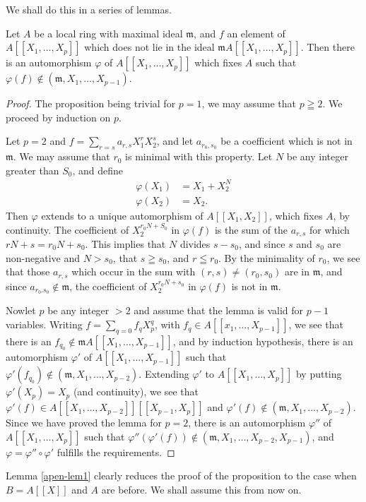 We shall do this in a series of lemmas.

\begin{lem}\label{apen-lem1}
Let $A$ be a local ring with maximal ideal $\mathfrak{m}$, and $f$ an element of $A \left[ [X_1, \ldots, X_p] \right]$ which does not lie in the ideal $\mathfrak{m} A \left[[X_1, \ldots, X_p] \right]$. Then there is an automorphism $\varphi$ of $A\left[[X_1, \ldots, X_p] \right]$ which fixes $A$ such that $\varphi (f)\not\in (\mathfrak{m}, X_1, \ldots, X_{p-1})$.
\end{lem}

\begin{proof}
The proposition being trivial for $p=1$, we may assume that $p \geqq 2$. We proceed by induction on $p$.

Let $p=2$ and $f = \sum\limits_{r = s} a_{r,s} X^r_1 X^s_2$, and let $a_{r_0, s_0}$ be a coefficient which is not in $\mathfrak{m}$. We may assume that $r_0$ is minimal with this property. Let $N$ be any integer greater than $S_0$, and define
\begin{align*}
\varphi (X_1) & = X_1 + X^N_2 \\
\varphi (X_2) & = X_2.
\end{align*}
Then $\varphi$ extends to a unique automorphism of $A \left[[X_1, X_2] \right]$, which fixes $A$, by continuity. The coefficient of $X^{r_0 N+ S_0}_2 $ in $\varphi (f)$ is the sum of the $a_{r,s}$ for which $rN+ s = r_0 N + s_0$. This implies that $N$ divides $s-s_0$, and since $s$ and $s_0$ are non-negative and $N >s_0$, that $s \geqq s_0$, and $r \leqq r_0$. By the minimality of $r_0$, we see that those $a_{r,s}$ which occur in the sum with $(r,s) \neq (r_0, s_0)$ are in $\mathfrak{m}$, and since $a_{r_0. s_0} \not\in \mathfrak{m}$, the coefficient of $X^{r_0 N+s_0}_2$ in $\varphi (f)$ is not in $\mathfrak{m}$.

Now\pageoriginale let $p$ be any integer $>2$ and assume that the lemma is valid for $p-1$ variables. Writing $f = \sum\limits_{q=0}f_q X^q_p$, with $f_q \in A \left[[x_1, \ldots, X_{p-1}] \right]$, we see that there is an $f_{q_0} \not\in \mathfrak{m} A \left[ [X_1, \ldots, X_{p-1}]\right]$, and by induction hypothesis, there is an automorphism $\varphi'$ of $A \left[[X_1,\ldots, X_{p-1}] \right]$ such that $\varphi'(f_{q_0}) \not\in (\mathfrak{m}, X_1, \ldots, X_{p-2})$. Extending $\varphi'$ to $A \left[[X_1,\ldots, X_p] \right]$ by putting $\varphi'(X_p) = X_p$ (and continuity), we see that $\varphi'(f) \in A \left[ [X_1, \ldots, X_{p-2}]\right]\left[ [X_{p-1}, X_p]\right]$ and $\varphi' (f) \not\in (\mathfrak{m}, X_1, \ldots, X_{p-2})$. Since we have proved the lemma for $p=2$, there is an automorphism $\varphi''$ of $A \left[[X_1, \ldots, X_p] \right]$ such that $\varphi''(\varphi'(f))\not\in (\mathfrak{m}, X_1, \ldots, X_{p-2}, X_{p-1})$, and $\varphi=\varphi'' \circ \varphi'$ fulfills the requirements.
\end{proof}
Lemma \ref{apen-lem1} clearly reduces the proof of the proposition to the case when $B = A[[X]]$ and $A$ are before. We shall assume this from now on.


